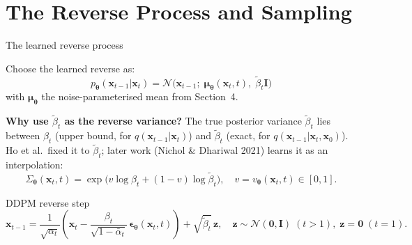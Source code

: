 \documentclass[aspectratio=169,11pt]{beamer}
\newcommand{\Norm}{\mathcal{N}}
\newcommand{\bx}{\bm{x}}
\newcommand{\bz}{\bm{z}}
\newcommand{\beps}{\bm{\epsilon}}
\newcommand{\bmu}{\bm{\mu}}
\newcommand{\btheta}{\bm{\theta}}
\begin{document}
\section{The Reverse Process and Sampling}

\begin{frame}{The learned reverse process}

Choose the learned reverse as:
\[
  p_{\btheta}(\bx_{t-1}|\bx_t)
  = \Norm\!\bigl(\bx_{t-1};\;\bmu_{\btheta}(\bx_t,t),\;\tilde\beta_t\mathbf{I}\bigr)
\]
with $\bmu_{\btheta}$ the noise-parameterised mean from Section~4.

\medskip
\textbf{Why use $\tilde\beta_t$ as the reverse variance?}
The true posterior variance $\tilde\beta_t$ lies between
$\beta_t$ (upper bound, for $q(\bx_{t-1}|\bx_t)$) and
$\tilde\beta_t$ (exact, for $q(\bx_{t-1}|\bx_t,\bx_0)$).
Ho et al.\ fixed it to $\tilde\beta_t$; later work (Nichol \& Dhariwal 2021)
learns it as an interpolation:
\[
  \Sigma_{\btheta}(\bx_t,t)
  = \exp\bigl(v\log\beta_t + (1-v)\log\tilde\beta_t\bigr),
  \quad v = v_{\btheta}(\bx_t,t)\in[0,1].
\]

\begin{block}{DDPM reverse step}
\[
  \bx_{t-1} = \frac{1}{\sqrt{\alpha_t}}\!\left(
    \bx_t - \frac{\beta_t}{\sqrt{1-\bar\alpha_t}}\,\beps_{\btheta}(\bx_t,t)
  \right)
  + \sqrt{\tilde\beta_t}\,\bz,\quad
  \bz\sim\Norm(\bm{0},\mathbf{I})\;(t>1),\;\bz=\bm{0}\;(t=1).
\]
\end{block}
\end{frame}
\end{document}
